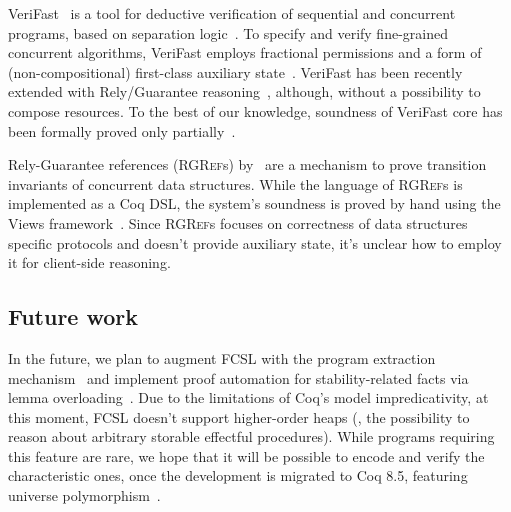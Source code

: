 VeriFast~\cite{Jacobs-al:NFM11} is a tool for deductive verification
of sequential and concurrent programs, based on separation
logic~\cite{Reynolds:LICS02}.
% 
%
To specify and verify fine-grained concurrent algorithms, VeriFast
employs fractional permissions and a form of (non-compositional)
first-class auxiliary state~\cite{Jacobs-Piessens:POPL11}. VeriFast
has been recently extended with Rely/Guarantee
reasoning~\cite{Jacobs-al:sharedboxes}, although, without a
possibility to compose resources. To the best of our knowledge,
soundness of VeriFast core has been formally proved only
partially~\cite{Vogels:PhD}.




Rely-Guarantee references (\textsc{RGRef}s) by~\citet{Gordon:PhD} are
a mechanism to prove transition invariants of concurrent data
structures.
%
%
While the language of \textsc{RGRef}s is implemented as a Coq DSL, the
system's soundness is proved by hand using the Views
framework~\cite{DinsdaleYoung-al:POPL13}.
%
Since \textsc{RGRef}s focuses on correctness of data structures \wrt
specific protocols and doesn't provide auxiliary state, it's unclear
how to employ it for client-side reasoning.


\subsection{Future work}
\label{sec:future-work}

In the future, we plan to augment FCSL with the program extraction
mechanism~\cite{Letouzey:CIE08} and implement proof automation for
stability-related facts via lemma
overloading~\cite{Gonthier-al:ICFP11}.
%
Due to the limitations of Coq's model \wrt impredicativity, at this
moment, FCSL doesn't support higher-order heaps (\ie, the possibility
to reason about arbitrary storable effectful procedures). While programs
requiring this feature are rare, we hope that it will be possible to
encode and verify the characteristic ones, once the development is
migrated to Coq 8.5, featuring universe
polymorphism~\cite{Sozeau-Tabareau:ITP14}.

